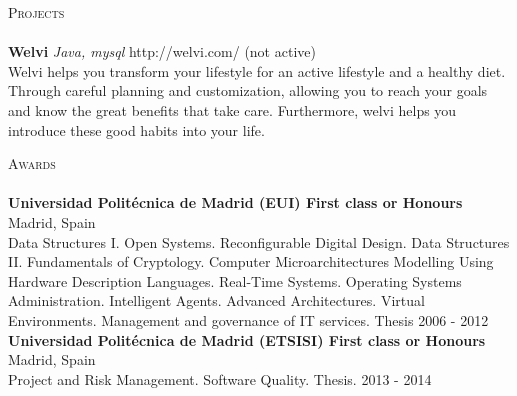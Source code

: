 \documentclass[a4paper]{article}
\newcommand{\lineunder} {
    \vspace*{-8pt} \\
    \hspace*{-18pt} \hrulefill \\
}
\newcommand{\header} [1] {
    {\hspace*{-18pt}\vspace*{6pt} \textsc{#1}}
    \vspace*{-6pt} \lineunder
}
\begin{document}
\header{Projects}
{\textbf{Welvi} \sl Java, mysql} \hfill http://welvi.com/ (not active)\\
Welvi helps you transform your lifestyle for an active lifestyle and a healthy diet. Through careful planning and customization, allowing you to reach your goals and know the great benefits that take care. Furthermore, welvi helps you introduce these good habits into your life.\\
\vspace*{2mm}

\vspace*{2mm}

\header{Awards}
\textbf{Universidad Polit\'ecnica de Madrid (EUI) First class or Honours} \hfill Madrid, Spain\\
Data Structures I. Open Systems. Reconfigurable Digital Design. Data Structures II. Fundamentals of Cryptology. Computer Microarchitectures Modelling Using Hardware Description Languages. Real-Time Systems. Operating Systems Administration. Intelligent Agents. Advanced Architectures. Virtual Environments. Management and governance of IT services. Thesis \hfill 2006 - 2012\\
\vspace*{2mm}
\textbf{Universidad Polit\'ecnica de Madrid (ETSISI) First class or Honours} \hfill Madrid, Spain\\
Project and Risk Management. Software Quality. Thesis. \hfill 2013 - 2014\\
\vspace*{2mm}

\ 
\end{document}
